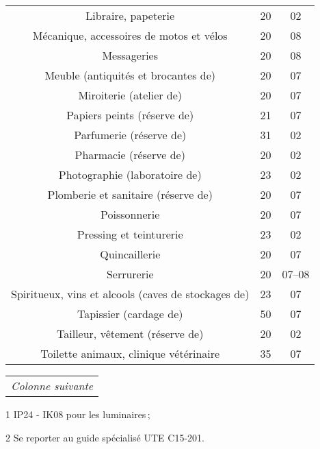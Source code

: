 \begin{minipage}[t]{0.49\linewidth}
\begin{tabularx}{\textwidth}[t]{c X c c}
\multicolumn{2}{p{4.8cm}}{Libraire, papeterie}																&	20				&	02 \\
\multicolumn{2}{p{4.8cm}}{Mécanique, accessoires de motos et vélos}							&	20				&	08 \\
\multicolumn{2}{p{4.8cm}}{Messageries}																		&	20				&	08 \\
\multicolumn{2}{p{4.8cm}}{Meuble (antiquités et brocantes de)}										&	20				&	07 \\
\multicolumn{2}{p{4.8cm}}{Miroiterie (atelier de)}															&	20				&	07 \\
\multicolumn{2}{p{4.8cm}}{Papiers peints (réserve de)}													&	21				&	07 \\
\multicolumn{2}{p{4.8cm}}{Parfumerie (réserve de)}														&	31				&	02 \\
\multicolumn{2}{p{4.8cm}}{Pharmacie (réserve de)}														&	20				&	02 \\
\multicolumn{2}{p{4.8cm}}{Photographie (laboratoire de)}												&	23				&	02 \\
\multicolumn{2}{p{4.8cm}}{Plomberie et sanitaire (réserve de)}										&	20				&	07 \\
\multicolumn{2}{p{4.8cm}}{Poissonnerie}																		&	20				&	07 \\
\multicolumn{2}{p{4.8cm}}{Pressing et teinturerie}															&	23				&	02 \\
\multicolumn{2}{p{4.8cm}}{Quincaillerie}																		&	20				&	07 \\
\multicolumn{2}{p{4.8cm}}{Serrurerie}																			&	20				&	07--08 \\
\multicolumn{2}{p{4.8cm}}{Spiritueux, vins et alcools (caves de stockages de)}				&	23				&	07 \\
\multicolumn{2}{p{4.8cm}}{Tapissier (cardage de)}															&	50				&	07 \\
\multicolumn{2}{p{4.8cm}}{Tailleur, vêtement (réserve de)}											&	20				&	02 \\
\multicolumn{2}{p{4.8cm}}{Toilette animaux, clinique vétérinaire}									&	35				&	07 \\
\bottomrule
\end{tabularx}
\end{minipage}
\begin{minipage}[b]{0.49\textwidth}
\begin{threeparttable}
\begin{tabularx}{\textwidth}[b]{R}
\midrule
\small\textit{Colonne suivante} \\
\end{tabularx}
\begin{tablenotes}
    \item[1] IP24 - IK08 pour les luminaires\,;
    \item[2] Se reporter au guide spécialisé UTE C15-201.
\end{tablenotes}
\end{threeparttable}
\end{minipage}

%

